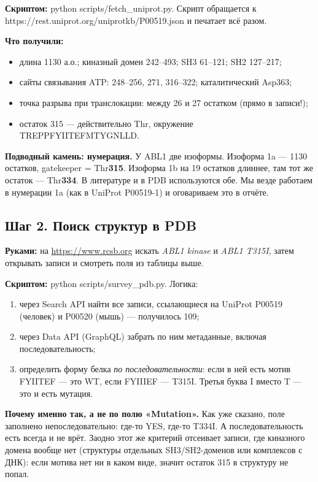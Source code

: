 \documentclass[11pt,a4paper]{article}
\newcommand{\code}[1]{{\ttfamily #1}}
\begin{document}
\textbf{Скриптом:} \code{python scripts/fetch\_uniprot.py}. Скрипт обращается к
\code{https://rest.uniprot.org/uniprotkb/P00519.json} и печатает всё разом.

\textbf{Что получили:}
\begin{itemize}[leftmargin=*,topsep=2pt,itemsep=1pt]
\item длина 1130 а.о.; киназный домен 242--493; SH3 61--121; SH2 127--217;
\item сайты связывания ATP: 248--256, 271, 316--322; каталитический Asp363;
\item точка разрыва при транслокации: между 26 и 27 остатком (прямо в записи!);
\item остаток 315 --- действительно Thr, окружение \code{TREPPFYIITEFMTYGNLLD}.
\end{itemize}

\begin{note}
\textbf{Подводный камень: нумерация.} У ABL1 две изоформы. Изоформа 1a --- 1130
остатков, gatekeeper = Thr\textbf{315}. Изоформа 1b на 19 остатков длиннее, там
тот же остаток --- Thr\textbf{334}. В литературе и в PDB используются обе. Мы
везде работаем в нумерации 1a (как в UniProt P00519-1) и оговариваем это в отчёте.
\end{note}

\subsection{Шаг 2. Поиск структур в PDB}

\textbf{Руками:} на \url{https://www.rcsb.org} искать \emph{ABL1 kinase} и
\emph{ABL1 T315I}, затем открывать записи и смотреть поля из таблицы выше.

\textbf{Скриптом:} \code{python scripts/survey\_pdb.py}. Логика:
\begin{enumerate}[leftmargin=*,topsep=2pt,itemsep=2pt]
\item через Search API найти все записи, ссылающиеся на UniProt \code{P00519}
(человек) и \code{P00520} (мышь) --- получилось 109;
\item через Data API (GraphQL) забрать по ним метаданные, включая
последовательность;
\item определить форму белка \emph{по последовательности}: если в ней есть мотив
\code{FYIITEF} --- это WT, если \code{FYIIIEF} --- T315I. Третья буква I вместо T ---
это и есть мутация.
\end{enumerate}

\textbf{Почему именно так, а не по полю «Mutation».} Как уже сказано, поле
заполнено непоследовательно: где-то \code{YES}, где-то \code{T334I}. А
последовательность есть всегда и не врёт. Заодно этот же критерий отсеивает
записи, где киназного домена вообще нет (структуры отдельных SH3/SH2-доменов или
комплексов с ДНК): если мотива нет ни в каком виде, значит остаток 315 в
структуру не попал.
\end{document}
